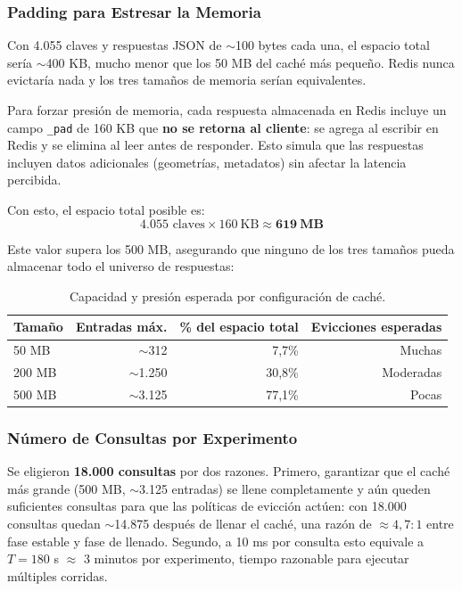 \documentclass[letter,12pt]{article}
\begin{document}
\subsubsection{Padding para Estresar la Memoria}

Con 4.055 claves y respuestas JSON de $\sim$100 bytes cada una, el espacio total sería
$\sim$400 KB, mucho menor que los 50 MB del caché más pequeño. Redis nunca evictaría
nada y los tres tamaños de memoria serían equivalentes.

Para forzar presión de memoria, cada respuesta almacenada en Redis incluye un campo
\texttt{\_pad} de 160 KB que \textbf{no se retorna al cliente}: se agrega al escribir
en Redis y se elimina al leer antes de responder. Esto simula que las respuestas
incluyen datos adicionales (geometrías, metadatos) sin afectar la latencia percibida.

Con esto, el espacio total posible es:
\[
4.055 \text{ claves} \times 160\ \text{KB} \approx \mathbf{619\ \text{MB}}
\]

Este valor supera los 500 MB, asegurando que ninguno de los tres tamaños pueda almacenar
todo el universo de respuestas:

\begin{table}[H]
\centering
\begin{tabular}{lrrr}
\toprule
\textbf{Tamaño} & \textbf{Entradas máx.} & \textbf{\% del espacio total} & \textbf{Evicciones esperadas} \\
\midrule
50 MB  & $\sim$312   & 7{,}7\%  & Muchas \\
200 MB & $\sim$1.250 & 30{,}8\% & Moderadas \\
500 MB & $\sim$3.125 & 77{,}1\% & Pocas \\
\bottomrule
\end{tabular}
\caption{Capacidad y presión esperada por configuración de caché.}
\end{table}

\subsubsection{Número de Consultas por Experimento}

Se eligieron \textbf{18.000 consultas} por dos razones. Primero, garantizar que el caché
más grande (500 MB, $\sim$3.125 entradas) se llene completamente y aún queden suficientes
consultas para que las políticas de evicción actúen: con 18.000 consultas quedan
$\sim$14.875 después de llenar el caché, una razón de $\approx 4{,}7:1$ entre fase
estable y fase de llenado. Segundo, a 10 ms por consulta esto equivale a $T = 180$ s
$\approx$ 3 minutos por experimento, tiempo razonable para ejecutar múltiples corridas.
\end{document}
